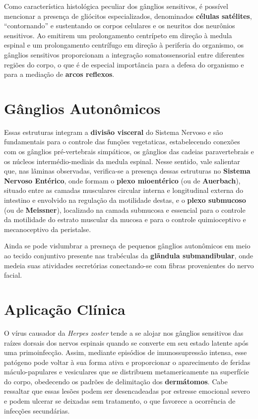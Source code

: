 \documentclass[
]{book}
\theoremstyle{definition}
\theoremstyle{definition}
\theoremstyle{definition}
\theoremstyle{definition}
\theoremstyle{remark}
\begin{document}
Como característica histológica peculiar dos gânglios sensitivos, é possível mencionar a presença de gliócitos especializados, denominados \textbf{células satélites}, ``contornando'' e sustentando os corpos celulares e os neuritos dos neurônios sensitivos. Ao emitirem um prolongamento centrípeto em direção à medula espinal e um prolongamento centrífugo em direção à periferia do organismo, os gânglios sensitivos proporcionam a integração somatossensorial entre diferentes regiões do corpo, o que é de especial importância para a defesa do organismo e para a mediação de \textbf{arcos reflexos}.

\hypertarget{guxe2nglios-autonuxf4micos}{%
\section{Gânglios Autonômicos}\label{guxe2nglios-autonuxf4micos}}

Essas estruturas integram a \textbf{divisão visceral} do Sistema Nervoso e são fundamentais para o controle das funções vegetaticas, estabelecendo conexões com os gânglios pré-vertebrais simpáticos, os gânglios das cadeias paravertebrais e os núcleos intermédio-mediais da medula espinal. Nesse sentido, vale salientar que, nas lâminas observadas, verifica-se a presença dessas estruturas no \textbf{Sistema Nervoso Entérico}, onde formam o \textbf{plexo mioentérico} (ou de \textbf{Auerbach}), situado entre as camadas musculares circular interna e longitudinal externa do intestino e envolvido na regulação da motilidade destas, e o \textbf{plexo submucoso} (ou de \textbf{Meissner}), localizado na camada submucosa e essencial para o controle da motilidade do estrato muscular da mucosa e para o controle quimioceptivo e mecanoceptivo da peristalse.

Ainda se pode vislumbrar a presneça de pequenos gânglios autonômicos em meio ao tecido conjuntivo presente nas trabéculas da \textbf{glãndula submandibular}, onde medeia suas atividades secretórias conectando-se com fibras provenientes do nervo facial.

\hypertarget{aplicauxe7uxe3o-cluxednica}{%
\section{Aplicação Clínica}\label{aplicauxe7uxe3o-cluxednica}}

O vírus causador da \emph{Herpes zoster} tende a se alojar nos gânglios sensitivos das raízes dorsais dos nervos espinais quando se converte em seu estado latente após uma primoinfecção. Assim, mediante episódios de imunossupressão intensa, esse patógeno pode voltar à sua forma ativa e proporcionar o aparecimento de feridas máculo-papulares e vesiculares que se distribuem metamericamente na superfície do corpo, obedecendo os padrões de delimitação dos \textbf{dermátomos}. Cabe ressaltar que essas lesões podem ser desencadeadas por estresse emocional severo e podem ulcerar se deixadas sem tratamento, o que favorece a ocorrência de infecções secundárias.
\end{document}
